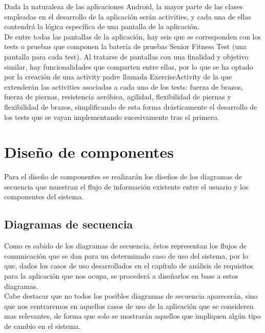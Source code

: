 Dada la naturaleza de las aplicaciones Android, la mayor parte de las clases empleadas en el desarrollo de la aplicación serán activities, y cada una de ellas contendrá la lógica específica de una pantalla de la aplicación.\\

De entre todas las pantallas de la aplicación, hay seis que se corresponden con los tests o pruebas que componen la batería de pruebas Senior Fitness Test (una pantalla para cada test). Al tratarse de pantallas con una finalidad y objetivo similar, hay funcionalidades que comparten entre ellas, por lo que se ha optado por la creación de una activity padre llamada ExerciseActivity de la que extenderán las activities asociadas a cada uno de los tests: fuerza de brazos, fuerza de piernas, resistencia aeróbica, agilidad, flexibilidad de piernas y flexibilidad de brazos, simplificando de esta forma drásticamente el desarrollo de los tests que se vayan implementando sucesivamente tras el primero.\\


\section{Diseño de componentes}

Para el diseño de componentes se realizarán los diseños de los diagramas de secuencia que muestran el flujo de información existente entre el usuario y los componentes del sistema.

\subsection{Diagramas de secuencia}

Como es sabido de los diagramas de secuencia, éstos representan los flujos de comunicación que se dan para un determinado caso de uso del sistema, por lo que, dados los casos de uso desarrollados en el capítulo de análisis de requisitos para la aplicación que nos ocupa, se procederá a diseñarlos en base a estos diagramas.\\

Cabe destacar que no todos los posibles diagramas de secuencia aparecerán, sino que nos centraremos en aquellos casos de uso de la aplicación que se consideren mas relevantes, de forma que solo se mostrarán aquellos que impliquen algún tipo de cambio en el sistema.

